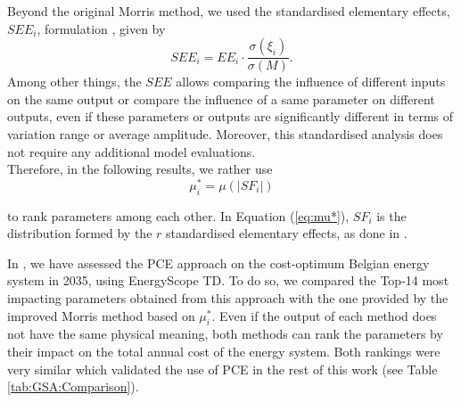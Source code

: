 Beyond the original Morris method, we used the standardised elementary effects, $SEE_{i}$, formulation \cite{Sin2009}, given by
\begin{equation}
    SEE_{i}=EE_{i}\cdot\frac{\sigma(\xi_i)}{\sigma(M)}.
\end{equation}
Among other things, the $SEE$ allows comparing the influence of different inputs on the same output or compare the influence of a same parameter on different outputs, even if these parameters or outputs are significantly different in terms of variation range or average amplitude. Moreover, this standardised analysis does not require any additional model evaluations.\\
Therefore, in the following results, we rather use
\begin{equation}
\mu^*_{i}=\mu(\vert SF_{i}\vert)
\label{eq:mu*}
\end{equation}

to rank parameters among each other. In Equation (\ref{eq:mu*}), $SF_{i}$ is the distribution formed by the $r$ standardised elementary effects, as done in \citet{Moret2017PhDThesis}.

In \cite{limpens2020impact}, we have assessed the \gls{PCE} approach on the cost-optimum Belgian energy system in 2035, using EnergyScope TD. To do so, we compared the Top-14 most impacting parameters obtained from this approach with the one provided by the improved Morris method based on $\mu^*_{i}$. Even if the output of each method does not have the same physical meaning, both methods can rank the parameters by their impact on the total annual cost of the energy system. Both rankings were very similar which validated the use of \gls{PCE} in the rest of this work (see Table \ref{tab:GSA:Comparison}).

